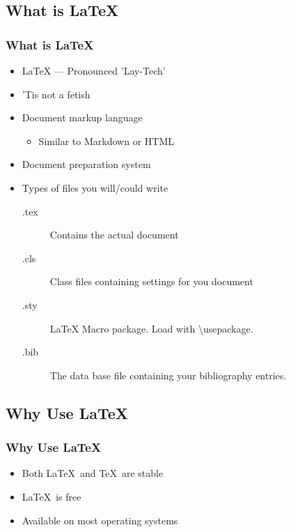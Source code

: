 \subsection{What is \LaTeX}

\begin{frame}[allowframebreaks=0.8]
\frametitle{What is \LaTeX}
    \begin{itemize}
        \item \LaTeX{} --- Pronounced 'Lay-Tech'
        \item 'Tis not a fetish
        \item Document markup language
        \begin{itemize}
            \item Similar to Markdown or HTML
        \end{itemize}
        \item Document preparation system
        \framebreak
        \item Types of files you will/could write
        \begin{description}
          \item[.tex] Contains the actual document
          \item[.cls] Class files containing settings for you document 
          \item[.sty] LaTeX Macro package. Load with 
                      \textbackslash usepackage.
          \item[.bib] The data base file containing your bibliography 
                      entries.
        \end{description}
    \end{itemize}
\end{frame}

\subsection{Why Use \LaTeX{}}

\begin{frame}
\frametitle{Why Use \LaTeX{}}
    \begin{itemize}
        \item Both \LaTeX\ and \TeX\ are stable
        \item \LaTeX\ is free
        \item Available on most operating systems
    \end{itemize}
\end{frame}



